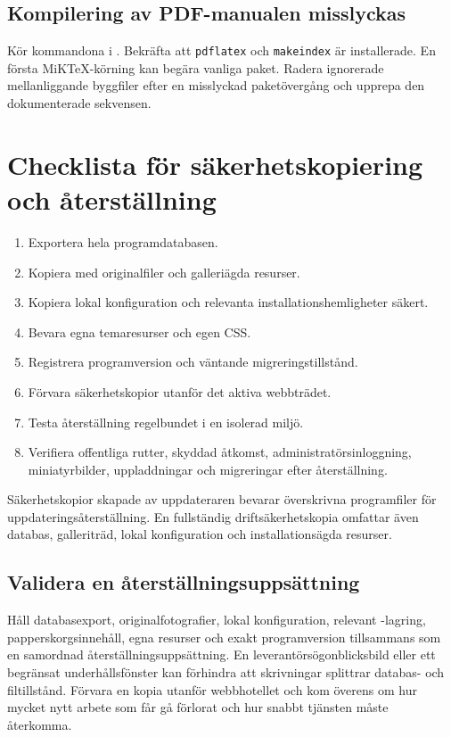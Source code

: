\documentclass[11pt,a4paper]{article}
\newcommand{\filepath}[1]{\path{#1}}
\newcommand{\codeword}[1]{\nolinkurl{#1}}
\begin{document}
\subsection{Kompilering av PDF-manualen misslyckas}

Kör kommandona i \filepath{docs/LATEX_BUILD.md}. Bekräfta att
\codeword{pdflatex} och \codeword{makeindex} är installerade. En första
MiKTeX-körning kan begära vanliga paket. Radera ignorerade mellanliggande
byggfiler efter en misslyckad paketövergång och upprepa den dokumenterade
sekvensen.

\section{Checklista för säkerhetskopiering och återställning}
\label{sec:backup}

\begin{enumerate}
  \item Exportera hela programdatabasen.
  \item Kopiera \filepath{galleries/} med originalfiler och galleriägda
  resurser.
  \item Kopiera lokal konfiguration och relevanta installationshemligheter
  säkert.
  \item Bevara egna temaresurser och egen CSS.
  \item Registrera programversion och väntande migreringstillstånd.
  \item Förvara säkerhetskopior utanför det aktiva webbträdet.
  \item Testa återställning regelbundet i en isolerad miljö.
  \item Verifiera offentliga rutter, skyddad åtkomst, administratörsinloggning,
  miniatyrbilder, uppladdningar och migreringar efter återställning.
\end{enumerate}

Säkerhetskopior skapade av uppdateraren bevarar överskrivna programfiler för
uppdateringsåterställning. En fullständig driftsäkerhetskopia omfattar även
databas, galleriträd, lokal konfiguration och installationsägda resurser.

\subsection{Validera en återställningsuppsättning}

Håll databasexport, originalfotografier, lokal konfiguration, relevant
\filepath{data/}-lagring, papperskorgsinnehåll, egna resurser och exakt
programversion tillsammans som en samordnad återställningsuppsättning. En
leverantörsögonblicksbild eller ett begränsat underhållsfönster kan förhindra
att skrivningar splittrar databas- och filtillstånd. Förvara en kopia utanför
webbhotellet och kom överens om hur mycket nytt arbete som får gå förlorat och
hur snabbt tjänsten måste återkomma.
\end{document}
